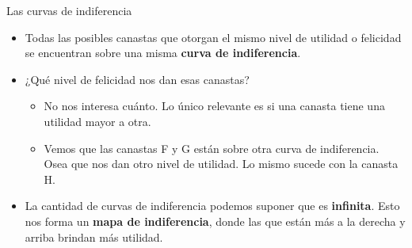 \documentclass{beamer}
\begin{document}
\begin{frame}{Las curvas de indiferencia}
    \begin{itemize}
        \item Todas las posibles canastas que otorgan el mismo nivel de utilidad o felicidad se encuentran sobre una misma \textbf{curva de indiferencia}. \vspace{2mm}
        \item ¿Qué nivel de felicidad nos dan esas canastas? 
        \begin{itemize}
        \item No nos interesa cuánto. Lo único relevante es si una canasta tiene una utilidad mayor a otra. 
        \item Vemos que las canastas F y G están sobre otra curva de indiferencia. Osea que nos dan otro nivel de utilidad. Lo mismo sucede con la canasta H. \vspace{1mm}
        \end{itemize}\pause
        \item La cantidad de curvas de indiferencia podemos suponer que es \textbf{infinita}. Esto nos forma un \textbf{mapa de indiferencia}, donde las que están más a la derecha y arriba brindan más utilidad.
    \end{itemize}
\end{frame}
\end{document}
